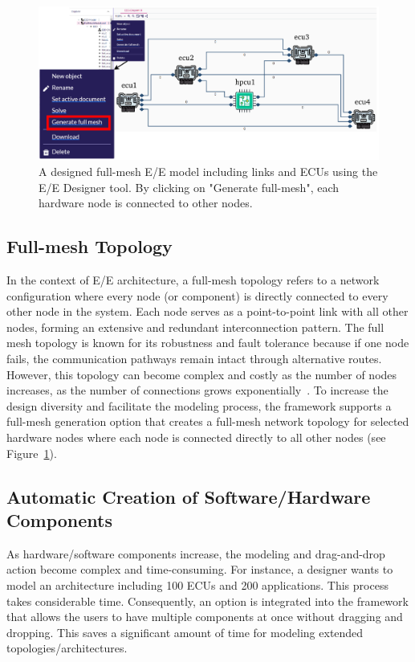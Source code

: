     \begin{figure}[b!]
	\centering
	\includegraphics[width=1\columnwidth]{figures/fullmesh_option.pdf}
	\caption{A designed full-mesh E/E model including links and ECUs using the E/E Designer tool. By clicking on "Generate full-mesh", each hardware node is connected to other nodes.}
	\label{fig0007} 
    \end{figure}
    
    \subsection{Full-mesh Topology}
    In the context of E/E architecture, a full-mesh topology refers to a network configuration where every node (or component) is directly connected to every other node in the system. Each node serves as a point-to-point link with all other nodes, forming an extensive and redundant interconnection pattern.
    The full mesh topology is known for its robustness and fault tolerance because if one node fails, the communication pathways remain intact through alternative routes. However, this topology can become complex and costly as the number of nodes increases, as the number of connections grows exponentially~\cite{9565115,9212001,askaripoor2023designer}. To increase the design diversity and facilitate the modeling process, the framework supports a full-mesh generation option that creates a full-mesh network topology for selected hardware nodes where each node is connected directly to all other nodes (see Figure~\ref{fig0007}).
    
    
    \subsection{Automatic Creation of Software/Hardware Components}
    
    As hardware/software components increase, the modeling and drag-and-drop action become complex and time-consuming. For instance, a designer wants to model an architecture including 100 ECUs and 200 applications. This process takes considerable time. Consequently, an option is integrated into the framework that allows the users to have multiple components at once without dragging and dropping. This saves a significant amount of time for modeling extended topologies/architectures.      
 
